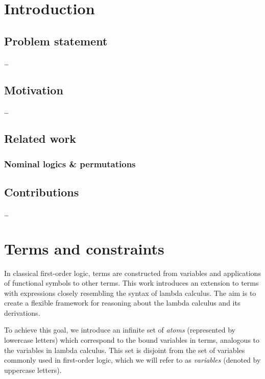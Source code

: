 \documentclass[english, mgr]{iithesis}
\author         {Dominik Gulczyński}
\date           {\today}                     %
\renewcommand{\it}[1]{\textit{#1}}
\begin{document}
\chapter{Introduction}

\section{Problem statement}
\dots

\section{Motivation}
\dots

\section{Related work}
\subsection{Nominal logics \& permutations}

\section{Contributions}
\dots

\chapter{Terms and constraints}

In classical first-order logic, terms are constructed from variables and applications of functional symbols to other terms. This work introduces an extension to terms with expressions closely resembling the syntax of lambda calculus. The aim is to create a flexible framework for reasoning about the lambda calculus and its derivations.

To achieve this goal, we introduce an infinite set of \it{atoms} (represented by lowercase letters) which correspond to the bound variables in terms, analogous to the variables in lambda calculus. This set is disjoint from the set of variables commonly used in first-order logic, which we will refer to as \it{variables} (denoted by uppercase letters).
\end{document}
